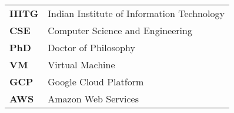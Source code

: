 \begin{table} [h]
\begin{tabular}{l l}  
		\textbf{IIITG} & Indian Institute of Information Technology\\ 
		\textbf{CSE} & Computer Science and Engineering\\
		\textbf{PhD} & Doctor of Philosophy\\
		\textbf{VM} & Virtual Machine\\
		\textbf{GCP} & Google Cloud Platform\\
		\textbf{AWS} & Amazon Web Services\\
\end{tabular}
\end{table} 